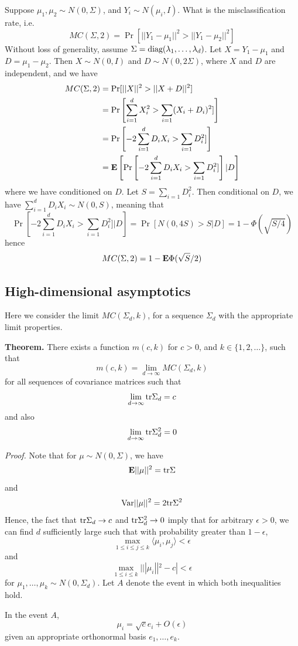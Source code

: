 \documentclass[12pt]{article}
\begin{document}
Suppose $\mu_1, \mu_2 \sim N(0, \Sigma)$, and $Y_i \sim N(\mu_i, I)$.
What is the misclassification rate, i.e.
\[
MC(\Sigma, 2) = \Pr[||Y_1 - \mu_1||^2 > ||Y_1 - \mu_2||^2]
\]
Without loss of generality, assume $\Sigma = \text{diag}(\lambda_1,\hdots, \lambda_d)$.
Let $X = Y_1 - \mu_1$ and $D = \mu_1 - \mu_2$.
Then $X \sim N(0, I)$ and $D \sim N(0, 2\Sigma)$, where $X$ and $D$ are independent, and we have
\begin{align*}
MC(\Sigma, 2) &= \Pr[||X||^2 > ||X + D||^2]
\\&= \Pr\left[\sum_{i=1}^d X_i^2 > \sum_{i=1} (X_i + D_i)^2]\right]
\\&= \Pr\left[-2 \sum_{i=1}^d D_i X_i > \sum_{i=1} D_i^2]\right]
\\&= \textbf{E}\left[\Pr\left[-2 \sum_{i=1}^d D_i X_i > \sum_{i=1} D_i^2]\right]|D\right]
\end{align*}
where we have conditioned on $D$.  Let $S = \sum_{i=1} D_i^2$.
Then conditional on $D$, we have $\sum_{i=1}^d D_i X_i \sim N(0, S)$, meaning that
\[
\Pr\left[-2 \sum_{i=1}^d D_i X_i > \sum_{i=1} D_i^2]|D\right] = \Pr[N(0, 4S) > S|D] = 1-\Phi(\sqrt{S/4})
\]
hence
\[
MC(\Sigma, 2) = 1 - \textbf{E} \Phi(\sqrt{S}/2)
\]

\subsection{High-dimensional asymptotics}

Here we consider the limit $MC(\Sigma_d, k)$, for a sequence $\Sigma_d$ with
the appropriate limit properties.

\textbf{Theorem.}
There exists a function $m(c, k)$ for $c > 0$, and $k \in \{1, 2, \hdots\}$, such that
\[
m(c, k) = \lim_{d \to \infty} MC(\Sigma_d, k)
\]
for all sequences of covariance matrices such that 
$$\lim_{d \to \infty} \text{tr} \Sigma_d = c$$
and also 
$$\lim_{d \to \infty} \text{tr} \Sigma_d^2 = 0$$

\emph{Proof.}
Note that for $\mu \sim N(0, \Sigma)$, we have
\[
\textbf{E} ||\mu||^2 = \text{tr} \Sigma
\]
and
\[
\text{Var} ||\mu||^2 = 2 \text{tr}\Sigma^2
\]
Hence, the fact that $\text{tr} \Sigma_d \to c$ and $\text{tr} \Sigma_d^2 \to 0$ imply that
for arbitrary $\epsilon > 0$, we can find $d$ sufficiently large such that with probability greater than $1-\epsilon$,
\[
\max_{1 \leq i \leq j \leq k} \langle \mu_i, \mu_j \rangle < \epsilon
\]
and
\[
\max_{1 \leq i \leq k} |||\mu_i||^2 - c| < \epsilon
\]
for $\mu_1,\hdots, \mu_k \sim N(0, \Sigma_d)$.
Let $A$ denote the event in which both inequalities hold.

In the event $A$, 
\[
\mu_i = \sqrt{c} e_i + O(\epsilon)
\]
given an appropriate orthonormal basis $e_1,\hdots, e_k$.
\end{document}
